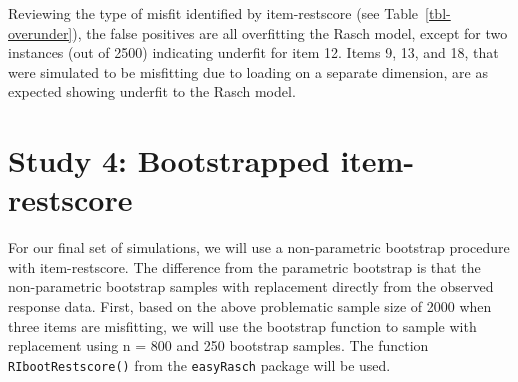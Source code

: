 \documentclass[
  letterpaper,
  DIV=11,
  numbers=noendperiod]{scrartcl}
\begin{document}
Reviewing the type of misfit identified by item-restscore (see
Table~\ref{tbl-overunder}), the false positives are all overfitting the
Rasch model, except for two instances (out of 2500) indicating underfit
for item 12. Items 9, 13, and 18, that were simulated to be misfitting
due to loading on a separate dimension, are as expected showing underfit
to the Rasch model.

\section{Study 4: Bootstrapped
item-restscore}\label{study-4-bootstrapped-item-restscore}

For our final set of simulations, we will use a non-parametric bootstrap
procedure with item-restscore. The difference from the parametric
bootstrap is that the non-parametric bootstrap samples with replacement
directly from the observed response data. First, based on the above
problematic sample size of 2000 when three items are misfitting, we will
use the bootstrap function to sample with replacement using n = 800 and
250 bootstrap samples. The function \texttt{RIbootRestscore()} from the
\texttt{easyRasch} package will be used.
\end{document}
